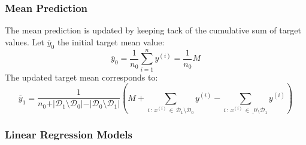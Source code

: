 \documentclass[a4paper, 11pt]{article}
\begin{document}
\subsubsection{Mean Prediction}

The mean prediction is updated by keeping tack of the cumulative sum of target values. Let $\overline{y}_0$ the initial target mean value:
$$
\overline{y}_0 = \frac{1}{n_0} \sum_{i = 1}^n y^{(i)} = \frac{1}{n_0} M
$$
The updated target mean corresponds to:
$$
\overline{y}_1 =  \frac{1}{n_0 + \vert \mathcal{D}_1 \setminus \mathcal{D}_0 \vert - \vert \mathcal{D}_0 \setminus \mathcal{D}_1 \vert}\left(M + \sum_{i \,:\, x^{(i)} \, \in \, \mathcal{D}_1 \setminus \mathcal{D}_0} y^{(i)} - \sum_{i \,:\, x^{(i)} \, \in \, \_0 \setminus \mathcal{D}_1} y^{(i)} \right)
$$

\subsubsection{Linear Regression Models}
\end{document}
